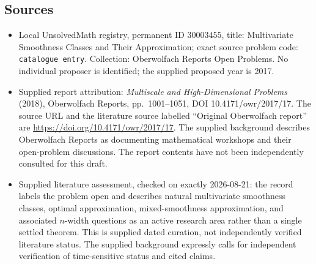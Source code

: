 \documentclass[11pt]{article}
\begin{document}
\subsection{Sources}
\begin{itemize}
\item Local UnsolvedMath registry, permanent ID \(30003455\), title: Multivariate Smoothness Classes and Their Approximation; exact source problem code: \texttt{catalogue entry}. Collection: Oberwolfach Reports Open Problems. No individual proposer is identified; the supplied proposed year is 2017.
\item Supplied report attribution: \emph{Multiscale and High-Dimensional Problems} (2018), Oberwolfach Reports, pp.\ 1001--1051, DOI 10.4171/owr/2017/17. The source URL and the literature source labelled ``Original Oberwolfach report'' are \url{https://doi.org/10.4171/owr/2017/17}. The supplied background describes Oberwolfach Reports as documenting mathematical workshops and their open-problem discussions. The report contents have not been independently consulted for this draft.
\item Supplied literature assessment, checked on exactly 2026-08-21: the record labels the problem open and describes natural multivariate smoothness classes, optimal approximation, mixed-smoothness approximation, and associated \(n\)-width questions as an active research area rather than a single settled theorem. This is supplied dated curation, not independently verified literature status. The supplied background expressly calls for independent verification of time-sensitive status and cited claims.
\end{itemize}
\end{document}
